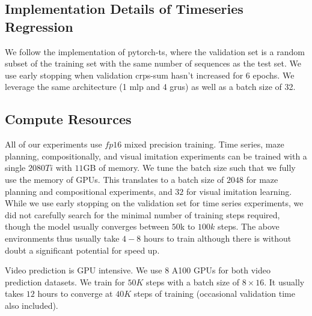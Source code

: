 \subsection{Implementation Details of Timeseries Regression}
We follow the implementation of pytorch-ts, where the validation set is a random subset of the training set with the same number of sequences as the test set. We use early stopping when validation crps-sum hasn't increased for 6 epochs. We leverage the same architecture (1 mlp and 4 grus) as well as a batch size of 32.


\subsection{Compute Resources}
All of our experiments use $fp16$ mixed precision training. Time series, maze planning, compositionally, and visual imitation experiments can be trained with a single $2080Ti$ with $11$GB of memory. We tune the batch size such that we fully use the memory of GPUs. This translates to a batch size of $2048$ for maze planning and compositional experiments, and $32$ for visual imitation learning. While we use early stopping on the validation set for time series experiments, we did not carefully search for the minimal number of training steps required, though the model usually converges between $50$k to $100k$ steps. The above environments thus usually take $4-8$ hours to train although there is without doubt a significant potential for speed up.

Video prediction is GPU intensive. We use $8$ A100 GPUs for both video prediction datasets. We train for $50K$ steps with a batch size of $8\times 16$. It usually takes $12$ hours to converge at $40K$ steps of training (occasional validation time also included). 

